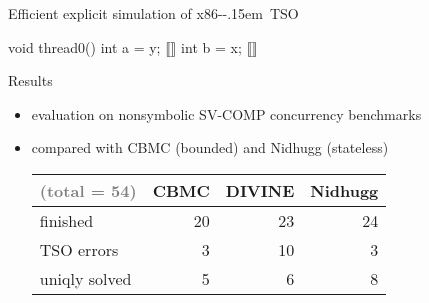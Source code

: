 \documentclass[aspectratio=169, fi]{paradise-slide}
\newcommand{\xtso}{\mbox{x86-\kern-.15em TSO}\xspace}
\begin{document}
\begin{frame}[fragile]{Efficient explicit simulation of \xtso}
\begin{minipage}[t]{0.35\textwidth}
  \newcommand{\ly}{\only<3->{\only<3>{\textcolor{frombuf}}{// \textrightarrow 2}}}
  \newcommand{\lx}{\only<5->{\only<5-6>{\textcolor{frombuf}}{// \textrightarrow 3}}}
  \begin{cppcode}
  void thread0() {
    int a = y; ⟦\ly⟧
    int b = x; ⟦\lx⟧
  }
  \end{cppcode}
  \end{minipage}
  \begin{minipage}[t]{0.60\textwidth}
      \begin{itemize}
      \end{itemize}
  \end{minipage}
\end{frame}

\begin{frame}{Results}

  \begin{itemize}
    \item evaluation on nonsymbolic SV-COMP concurrency benchmarks
    \item compared with CBMC (bounded) and Nidhugg (stateless)

    \vspace{2ex}
    \setlength\tabcolsep{0.5em} %
    \begin{tabular}{lrrr} \toprule
        \textcolor{gray}{(total = 54)} & CBMC & \textbf{DIVINE} & Nidhugg \\ \midrule
        finished                & 20   & 23     & 24 \\
        TSO errors              &  3   & 10     &  3 \\
        uniqly solved           &  5   &  6     &  8 \\
        \bottomrule
    \end{tabular}
  \end{itemize}
\end{frame}
\end{document}
